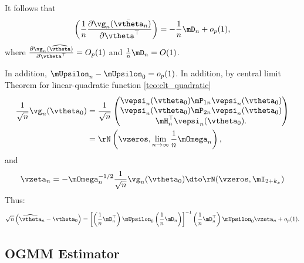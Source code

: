 \documentclass[english,12pt]{book}\usepackage[]{graphicx}\usepackage[]{xcolor}
\begin{document}
It follows that 
  \begin{equation*}
  \left(\frac{1}{n}\frac{\partial \vg_n(\bar{\vtheta}_n)}{\partial \vtheta^\top}\right) = -\frac{1}{n}\mD_n + o_p(1),
  \end{equation*}
  where $\frac{\partial \vg_n(\widehat{\vtheta})}{\partial \vtheta^\top} = O_p(1)$ and $\frac{1}{n}\mD_n = O(1)$. 
  
  In addition, $\mUpsilon_n - \mUpsilon_0 = o_p(1)$. In addition, by central limit Theorem for linear-quadratic function \ref{teo:clt_quadratic}
  \begin{equation*}
    \begin{aligned}
      \frac{1}{\sqrt{n}}\vg_n(\vtheta_0) & = \frac{1}{\sqrt{n}}
                                              \begin{pmatrix}
                                               \vepsi_n(\vtheta_0)\mP_{1n}\vepsi_n(\vtheta_0)\\
                                               \vepsi_n(\vtheta_0)\mP_{2n}\vepsi_n(\vtheta_0)\\
                                               \mH_n^\top\vepsi_n(\vtheta_0).
                                              \end{pmatrix} \\
                                        & = \rN\left(\vzeros, \lim_{n\to\infty}\frac{1}{n}\mOmega_n\right),
                                        \end{aligned}
  \end{equation*}
  and
  \begin{equation*}
    \begin{aligned}
      \vzeta_n = -\mOmega_n^{-1/2}\frac{1}{\sqrt{n}}\vg_n(\vtheta_0)\dto \rN(\vzeros, \mI_{2+k_x})
    \end{aligned}
      \end{equation*}
    Thus:
    \begin{equation*}
      \sqrt{n}\left(\widehat{\vtheta}_n - \vtheta_0\right) = \left[\left(\frac{1}{n}\mD_n^\top\right)\mUpsilon_0\left(\frac{1}{n}\mD_n\right)\right]^{-1}\left(\frac{1}{n}\mD_n^\top\right)\mUpsilon_0\vzeta_n + o_p(1).
    \end{equation*}


\subsection{OGMM Estimator}
\end{document}
